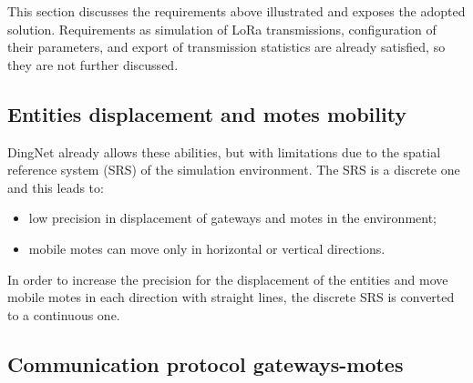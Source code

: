 This section discusses the requirements above illustrated and exposes the adopted solution. 
Requirements as simulation of LoRa transmissions, configuration of their parameters, and export of transmission statistics are already satisfied, so they are not further discussed.

\subsection*{Entities displacement and motes mobility}
DingNet already allows these abilities, but with limitations due to the spatial reference system (SRS) of the simulation environment. The SRS is a discrete one and this leads to:
\begin{itemize}
    \item low precision in displacement of gateways and motes in the environment;
    \item mobile motes can move only in horizontal or vertical directions. 
\end{itemize}  
In order to increase the precision for the displacement of the entities and move mobile motes in each direction with straight lines, the discrete SRS is converted to a continuous one. 

\subsection*{Communication protocol gateways-motes}

